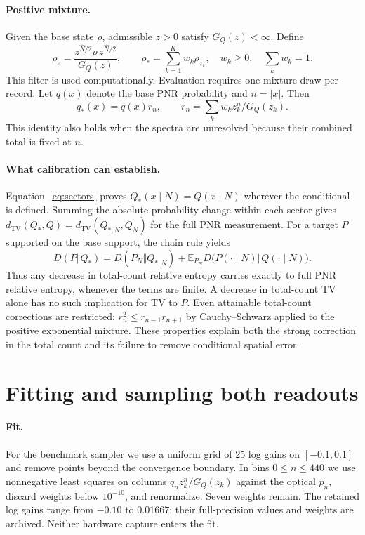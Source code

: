 \documentclass[11pt]{article}
\newcommand{\TV}{d_{\mathrm{TV}}}
\newcommand{\E}{\mathbb{E}}
\begin{document}
\paragraph{Positive mixture.}
Given the base state $\rho$, admissible $z>0$ satisfy $G_Q(z)<\infty$. Define
\begin{equation}
 \rho_z=\frac{z^{\hat N/2}\rho\,z^{\hat N/2}}{G_Q(z)},\qquad
 \rho_*=\sum_{k=1}^{K}w_k\rho_{z_k},\quad w_k\ge0,\quad\sum_k w_k=1 .
 \label{eq:filter}
\end{equation}
This filter is used computationally. Evaluation requires one mixture draw per record. Let $q(x)$ denote the base PNR probability and $n=|x|$. Then
\begin{equation}
 q_*(x)=q(x)r_n,\qquad r_n=\sum_k w_k z_k^n/G_Q(z_k).
 \label{eq:sectors}
\end{equation}
This identity also holds when the spectra are unresolved because their combined total is fixed at $n$.

\paragraph{What calibration can establish.}
Equation~\eqref{eq:sectors} proves $Q_*(x\mid N)=Q(x\mid N)$ wherever the conditional is defined. Summing the absolute probability change within each sector gives $\TV(Q_*,Q)=\TV(Q_{*,N},Q_N)$ for the full PNR measurement. For a target $P$ supported on the base support, the chain rule yields
\begin{equation}
 D(P\Vert Q_*)=D(P_N\Vert Q_{*,N})+
      \E_{P_N}D\big(P(\cdot\mid N)\Vert Q(\cdot\mid N)\big).
 \label{eq:kl}
\end{equation}
Thus any decrease in total-count relative entropy carries exactly to full PNR relative entropy, whenever the terms are finite. A decrease in total-count TV alone has no such implication for TV to $P$. Even attainable total-count corrections are restricted: $r_n^2\le r_{n-1}r_{n+1}$ by Cauchy--Schwarz applied to the positive exponential mixture. These properties explain both the strong correction in the total count and its failure to remove conditional spatial error.

\section{Fitting and sampling both readouts}
\paragraph{Fit.}
For the benchmark sampler we use a uniform grid of 25 log gains on $[-0.1,0.1]$ and remove points beyond the convergence boundary. In bins $0\le n\le440$ we use nonnegative least squares on columns $q_n z_k^n/G_Q(z_k)$ against the optical $p_n$, discard weights below $10^{-10}$, and renormalize. Seven weights remain. The retained log gains range from $-0.10$ to $0.01667$; their full-precision values and weights are archived. Neither hardware capture enters the fit.
\end{document}
